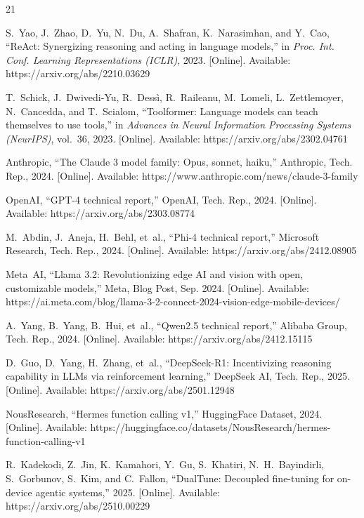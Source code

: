 \documentclass[conference]{IEEEtran}
\begin{document}
\begin{thebibliography}{21}

S.~Yao, J.~Zhao, D.~Yu, N.~Du, A.~Shafran, K.~Narasimhan, and Y.~Cao,
``ReAct: Synergizing reasoning and acting in language models,''
in \emph{Proc. Int. Conf. Learning Representations (ICLR)}, 2023.
[Online]. Available: https://arxiv.org/abs/2210.03629

T.~Schick, J.~Dwivedi-Yu, R.~Dess\`{i}, R.~Raileanu, M.~Lomeli, L.~Zettlemoyer, N.~Cancedda, and T.~Scialom,
``Toolformer: Language models can teach themselves to use tools,''
in \emph{Advances in Neural Information Processing Systems (NeurIPS)}, vol.~36, 2023.
[Online]. Available: https://arxiv.org/abs/2302.04761

Anthropic,
``The Claude 3 model family: Opus, sonnet, haiku,''
Anthropic, Tech. Rep., 2024.
[Online]. Available: https://www.anthropic.com/news/claude-3-family

OpenAI,
``GPT-4 technical report,''
OpenAI, Tech. Rep., 2024.
[Online]. Available: https://arxiv.org/abs/2303.08774

M.~Abdin, J.~Aneja, H.~Behl, et~al.,
``Phi-4 technical report,''
Microsoft Research, Tech. Rep., 2024.
[Online]. Available: https://arxiv.org/abs/2412.08905

Meta~AI,
``Llama 3.2: Revolutionizing edge AI and vision with open, customizable models,''
Meta, Blog Post, Sep. 2024.
[Online]. Available: https://ai.meta.com/blog/llama-3-2-connect-2024-vision-edge-mobile-devices/

A.~Yang, B.~Yang, B.~Hui, et~al.,
``Qwen2.5 technical report,''
Alibaba Group, Tech. Rep., 2024.
[Online]. Available: https://arxiv.org/abs/2412.15115

D.~Guo, D.~Yang, H.~Zhang, et~al.,
``DeepSeek-R1: Incentivizing reasoning capability in LLMs via reinforcement learning,''
DeepSeek AI, Tech. Rep., 2025.
[Online]. Available: https://arxiv.org/abs/2501.12948

NousResearch,
``Hermes function calling v1,''
HuggingFace Dataset, 2024.
[Online]. Available: https://huggingface.co/datasets/NousResearch/hermes-function-calling-v1

R.~Kadekodi, Z.~Jin, K.~Kamahori, Y.~Gu, S.~Khatiri, N.~H.~Bayindirli, S.~Gorbunov, S.~Kim, and C.~Fallon,
``DualTune: Decoupled fine-tuning for on-device agentic systems,''
2025.
[Online]. Available: https://arxiv.org/abs/2510.00229


\end{thebibliography}
\end{document}
